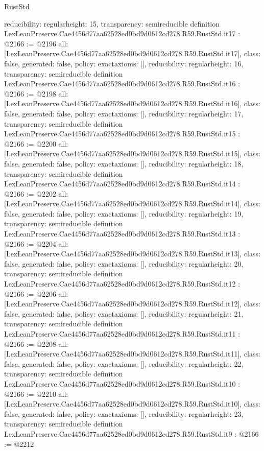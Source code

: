 \begin{lexlean}{RustStd}
\begin{coremodule}
{  reducibility: regular{height: 15},
  transparency: semireducible
}
definition LexLeanPreserve.Cae4456d77aa62528ed0bd9d0612cd278.R59.RustStd.it17 : @2166 := @2196 {
  all: [LexLeanPreserve.Cae4456d77aa62528ed0bd9d0612cd278.R59.RustStd.it17],
  class: false,
  generated: false,
  policy: exact{axioms: []},
  reducibility: regular{height: 16},
  transparency: semireducible
}
definition LexLeanPreserve.Cae4456d77aa62528ed0bd9d0612cd278.R59.RustStd.it16 : @2166 := @2198 {
  all: [LexLeanPreserve.Cae4456d77aa62528ed0bd9d0612cd278.R59.RustStd.it16],
  class: false,
  generated: false,
  policy: exact{axioms: []},
  reducibility: regular{height: 17},
  transparency: semireducible
}
definition LexLeanPreserve.Cae4456d77aa62528ed0bd9d0612cd278.R59.RustStd.it15 : @2166 := @2200 {
  all: [LexLeanPreserve.Cae4456d77aa62528ed0bd9d0612cd278.R59.RustStd.it15],
  class: false,
  generated: false,
  policy: exact{axioms: []},
  reducibility: regular{height: 18},
  transparency: semireducible
}
definition LexLeanPreserve.Cae4456d77aa62528ed0bd9d0612cd278.R59.RustStd.it14 : @2166 := @2202 {
  all: [LexLeanPreserve.Cae4456d77aa62528ed0bd9d0612cd278.R59.RustStd.it14],
  class: false,
  generated: false,
  policy: exact{axioms: []},
  reducibility: regular{height: 19},
  transparency: semireducible
}
definition LexLeanPreserve.Cae4456d77aa62528ed0bd9d0612cd278.R59.RustStd.it13 : @2166 := @2204 {
  all: [LexLeanPreserve.Cae4456d77aa62528ed0bd9d0612cd278.R59.RustStd.it13],
  class: false,
  generated: false,
  policy: exact{axioms: []},
  reducibility: regular{height: 20},
  transparency: semireducible
}
definition LexLeanPreserve.Cae4456d77aa62528ed0bd9d0612cd278.R59.RustStd.it12 : @2166 := @2206 {
  all: [LexLeanPreserve.Cae4456d77aa62528ed0bd9d0612cd278.R59.RustStd.it12],
  class: false,
  generated: false,
  policy: exact{axioms: []},
  reducibility: regular{height: 21},
  transparency: semireducible
}
definition LexLeanPreserve.Cae4456d77aa62528ed0bd9d0612cd278.R59.RustStd.it11 : @2166 := @2208 {
  all: [LexLeanPreserve.Cae4456d77aa62528ed0bd9d0612cd278.R59.RustStd.it11],
  class: false,
  generated: false,
  policy: exact{axioms: []},
  reducibility: regular{height: 22},
  transparency: semireducible
}
definition LexLeanPreserve.Cae4456d77aa62528ed0bd9d0612cd278.R59.RustStd.it10 : @2166 := @2210 {
  all: [LexLeanPreserve.Cae4456d77aa62528ed0bd9d0612cd278.R59.RustStd.it10],
  class: false,
  generated: false,
  policy: exact{axioms: []},
  reducibility: regular{height: 23},
  transparency: semireducible
}
definition LexLeanPreserve.Cae4456d77aa62528ed0bd9d0612cd278.R59.RustStd.it9 : @2166 := @2212 {
}
\end{coremodule}
\end{lexlean}
